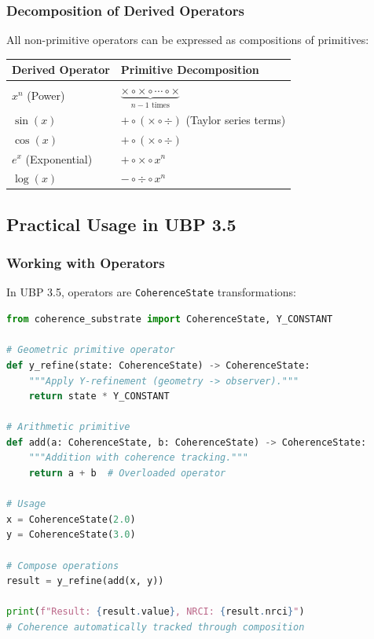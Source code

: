 \subsubsection{Decomposition of Derived Operators}

All non-primitive operators can be expressed as compositions of primitives:

\begin{table}[h]
\centering
\begin{tabular}{ll}
\toprule
\textbf{Derived Operator} & \textbf{Primitive Decomposition} \\
\midrule
$x^n$ (Power) & $\underbrace{\times \circ \times \circ \cdots \circ \times}_{n-1 \text{ times}}$ \\
$\sin(x)$ & $+ \circ (\times \circ \div)$ (Taylor series terms) \\
$\cos(x)$ & $+ \circ (\times \circ \div)$ \\
$e^x$ (Exponential) & $+ \circ \times \circ x^n$ \\
$\log(x)$ & $- \circ \div \circ x^n$ \\
\bottomrule
\end{tabular}
\end{table}

\subsection{Practical Usage in UBP 3.5}

\subsubsection{Working with Operators}

In UBP 3.5, operators are \texttt{CoherenceState} transformations:

\begin{lstlisting}[language=Python, caption=Operator Usage]
from coherence_substrate import CoherenceState, Y_CONSTANT

# Geometric primitive operator
def y_refine(state: CoherenceState) -> CoherenceState:
    """Apply Y-refinement (geometry -> observer)."""
    return state * Y_CONSTANT

# Arithmetic primitive
def add(a: CoherenceState, b: CoherenceState) -> CoherenceState:
    """Addition with coherence tracking."""
    return a + b  # Overloaded operator

# Usage
x = CoherenceState(2.0)
y = CoherenceState(3.0)

# Compose operations
result = y_refine(add(x, y))

print(f"Result: {result.value}, NRCI: {result.nrci}")
# Coherence automatically tracked through composition
\end{lstlisting}

